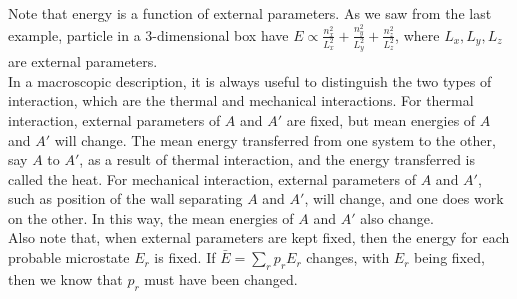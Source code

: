 \documentclass[11pt,oneside]{book}
\theoremstyle{break}
\theoremstyle{break}
\begin{document}
Note that energy is a function of external parameters. As we saw from the last example, particle in a $3$-dimensional box have $E\propto \frac{n_x^2}{L_x^2} +\frac{n_y^2}{L_y^2}+ \frac{n_z^2}{L_z^2}$, where $L_x, L_y, L_z$ are external parameters. \\

In a macroscopic description, it is always useful to distinguish the two types of interaction, which are the thermal and mechanical interactions. For thermal interaction, external parameters of $A$ and $A'$ are fixed, but mean energies of $A$ and $A'$ will change. The mean energy transferred from one system to the other, say $A$ to $A'$, as a result of thermal interaction, and the energy transferred is called the heat. For mechanical interaction, external parameters of $A$ and $A'$, such as position of the wall separating $A$ and $A'$, will change, and one does work on the other. In this way, the mean energies of $A$ and $A'$ also change. \\

Also note that, when external parameters are kept fixed, then the energy for each probable microstate $E_r$ is fixed. If $\bar{E} = \sum_r p_r E_r$ changes, with $E_r$ being fixed, then we know that $p_r$ must have been changed.   \\
\end{document}
